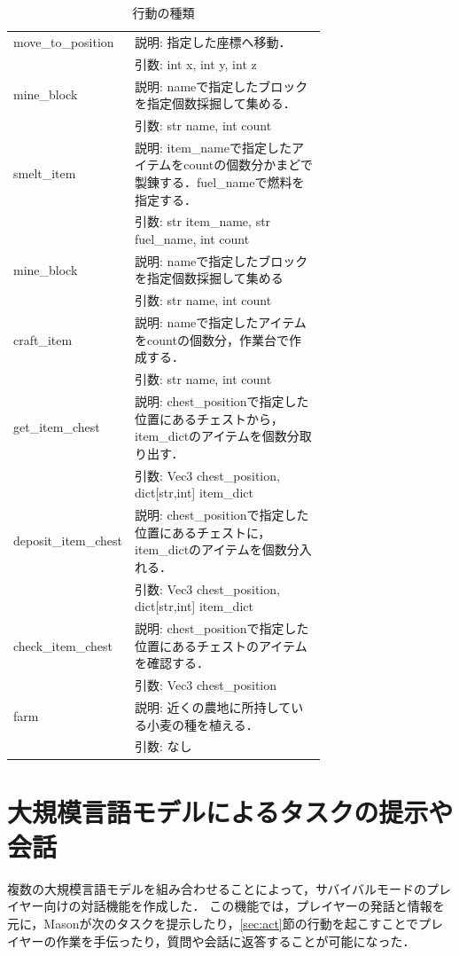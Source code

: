 \begin{table}[H]
    \caption{行動の種類}\label{tab:action}
    \centering
    \begin{tabular}{lp{0.7\linewidth}}
        \hline \hline
        move\_to\_position & 説明: 指定した座標へ移動． \\
        　 & 引数: int x, int y, int z \\
        \hline
        mine\_block & 説明: nameで指定したブロックを指定個数採掘して集める． \\
        　 & 引数: str name, int count \\
        \hline
        smelt\_item & 説明: item\_nameで指定したアイテムをcountの個数分かまどで製錬する．fuel\_nameで燃料を指定する． \\
        　 & 引数: str item\_name, str fuel\_name, int count \\
        \hline
        mine\_block & 説明: nameで指定したブロックを指定個数採掘して集める \\
        　 & 引数: str name, int count \\
        \hline
        craft\_item & 説明: nameで指定したアイテムをcountの個数分，作業台で作成する． \\
        　 & 引数: str name, int count \\
        \hline
        get\_item\_chest & 説明: chest\_positionで指定した位置にあるチェストから，item\_dictのアイテムを個数分取り出す． \\
        　 & 引数: Vec3 chest\_position, dict[str,int] item\_dict \\
        \hline
        deposit\_item\_chest & 説明: chest\_positionで指定した位置にあるチェストに，item\_dictのアイテムを個数分入れる． \\
        　 & 引数: Vec3 chest\_position, dict[str,int] item\_dict \\
        \hline
        check\_item\_chest & 説明: chest\_positionで指定した位置にあるチェストのアイテムを確認する． \\
        　 & 引数: Vec3 chest\_position \\
        \hline
        farm & 説明: 近くの農地に所持している小麦の種を植える． \\
        　 & 引数: なし \\
        \hline
    \end{tabular}
\end{table}

\section{大規模言語モデルによるタスクの提示や会話}\label{sec:gpt_res}
複数の大規模言語モデルを組み合わせることによって，サバイバルモードのプレイヤー向けの対話機能を作成した．
この機能では，プレイヤーの発話と情報を元に，Masonが次のタスクを提示したり，\ref{sec:act}節の行動を起こすことでプレイヤーの作業を手伝ったり，質問や会話に返答することが可能になった．

